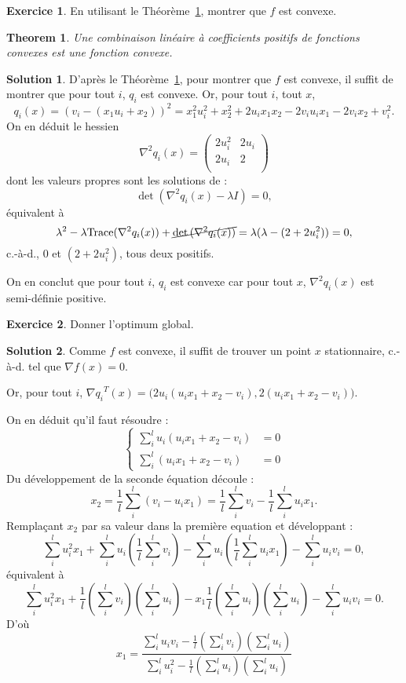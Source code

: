 \documentclass[a4paper,francais]{article}
\newcommand{\cad}{c.-à-d.}
\newtheorem{Theorem}{Theorem}
\theoremstyle{definition}
\newtheorem{exercice}{Exercice}[section]
\newtheorem*{solution}{Solution}
\begin{document}
\begin{exercice}
En utilisant le Théorème~\ref{th:fonc-conv}, montrer que $f$ est convexe.   
\end{exercice}

\begin{Theorem}
  \label{th:fonc-conv}
  Une combinaison linéaire à coefficients positifs de fonctions convexes est une fonction convexe.
\end{Theorem}

\begin{solution}
  D'après le Théorème~\ref{th:fonc-conv}, pour montrer que $f$ est convexe, il suffit de montrer que
  pour tout $i$, $q_i$ est convexe.
  Or, pour tout $i$, tout $x$,
  \[
  q_i(x) =  (v_i - (x_1u_i + x_2))^2 = x_1^2 u_i^2 + x_2^2 + 2u_ix_1x_2 - 2v_iu_ix_1 - 2v_ix_2 + v_i^2.
  \]
  On en déduit le hessien
  \[
  \nabla^2q_i(x) = 
  \left(
  \begin{array}{cc}
    2u_i^2 & 2u_i \\
    2u_i & 2 \\
  \end{array}
  \right)
  \]
  dont les valeurs propres sont les solutions de :
  \[
  \det{(\nabla^2q_i(x) - \lambda I)} = 0, 
  \]
  équivalent à
  \[
  \lambda^2 - \lambda\text{Trace}(\nabla^2q_i(x)) + \cancel{\det{(\nabla^2q_i(x))}}
  = \lambda(\lambda - (2 + 2u_i^2)) = 0, 
  \]
  {\cad}, $0$ et $(2 + 2u_i^2)$, tous deux positifs.

  On en conclut que pour tout $i$, $q_i$ est convexe car pour tout $x$,
  $\nabla^2q_i(x)$ est semi-définie positive.  
\end{solution}

\begin{exercice}
   Donner l'optimum global.
\end{exercice}

\begin{solution}
  Comme $f$ est convexe, il suffit de trouver un point $x$ stationnaire,
  {\cad} tel que $\nabla f(x) = 0$.

  Or, pour tout $i$, ${\nabla q_i}^T(x) = \big( 2u_i (u_ix_1 + x_2 - v_i), 2(u_ix_1 + x_2 - v_i) \big)$.

  On en déduit qu'il faut résoudre :
  \[
  \left\{
  \begin{array}{cc}
    \sum_i^l u_i (u_ix_1 + x_2 - v_i) &= 0 \\
    \sum_i^l (u_ix_1 + x_2 - v_i) &= 0
  \end{array}
  \right.
  \]
  Du développement de la seconde équation découle :
  \[
  x_2 = \frac{1}{l} \sum_i^l (v_i - u_ix_1) = \frac{1}{l} \sum_i^l v_i - \frac{1}{l} \sum_i^l u_ix_1. 
  \]
  Remplaçant $x_2$ par sa valeur dans la première equation et développant :
  \[
  \sum_i^l u_i^2 x_1 + \sum_i^l u_i (\frac{1}{l} \sum_i^l v_i) - \sum_i^l u_i (\frac{1}{l} \sum_i^l u_ix_1) - \sum_i^l u_iv_i = 0,
  \]
  équivalent à 
  \[
  \sum_i^l u_i^2 x_1 + \frac{1}{l} (\sum_i^l v_i)(\sum_i^l u_i) - x_1 \frac{1}{l} (\sum_i^l u_i)(\sum_i^l u_i)  - \sum_i^l u_iv_i = 0.
  \]
  D'où
  \[
  x_1 = \frac{\sum_i^l u_iv_i - \frac{1}{l} (\sum_i^l v_i)(\sum_i^l u_i)}{\sum_i^l u_i^2 - \frac{1}{l} (\sum_i^l u_i)(\sum_i^l u_i)}
  \]
\end{solution}
  
%
%
\end{document}
